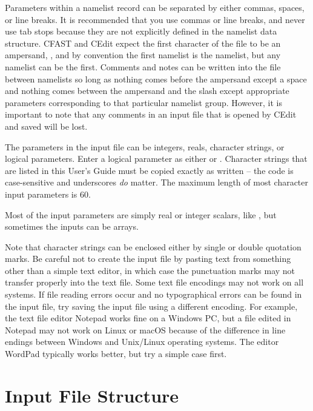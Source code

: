Parameters within a namelist record can be separated by either commas, spaces, or line breaks. It is recommended that you use commas or line breaks, and never use tab stops because they are not explicitly defined in the namelist data structure. CFAST and CEdit expect the first character of the file to be an ampersand, \ct{&}, and by convention the first namelist is the  namelist, but any namelist can be the first. Comments and notes can be written into the file between namelists so long as nothing comes before the ampersand except a space and nothing comes between the ampersand and the slash except appropriate parameters corresponding to that particular namelist group. However, it is important to note that any comments in an input file that is opened by CEdit and saved will be lost.

The parameters in the input file can be integers, reals, character strings, or logical parameters. Enter a logical parameter as either  or . Character strings that are listed in this User's Guide must be copied exactly as written -- the code is case-sensitive and underscores {\em do} matter. The maximum length of most character input parameters is 60.

Most of the input parameters are simply real or integer scalars, like , but sometimes the inputs can be arrays.

Note that character strings can be enclosed either by single or double quotation marks. Be careful not to create the input file by pasting text from something other than a simple text editor, in which case the punctuation marks may not transfer properly into the text file. Some text file encodings may not work on all systems. If file reading errors occur and no typographical errors can be found in the input file, try saving the input file using a different encoding. For example, the text file editor Notepad works fine on a Windows PC, but a file edited in Notepad may not work on Linux or macOS because of the difference in line endings between Windows and Unix/Linux operating systems. The editor WordPad typically works better, but try a simple case first.


\section{Input File Structure}

